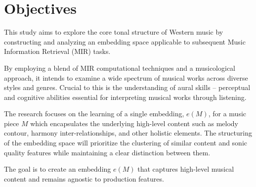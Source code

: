 \section{Objectives}

This study aims to explore the core tonal structure of Western music by constructing and analyzing an embedding space applicable to subsequent Music Information Retrieval (MIR) tasks. 

By employing a blend of MIR computational techniques and a musicological approach, it intends to examine a wide spectrum of musical works across diverse styles and genres. Crucial to this is the understanding of aural skills – perceptual and cognitive abilities essential for interpreting musical works through listening. 

The research focuses on the learning of a single embedding, $e(M)$, for a music piece $M$ which encapsulates the underlying high-level content such as melody contour, harmony inter-relationships, and other holistic elements. The structuring of the embedding space will prioritize the clustering of similar content and sonic quality features while maintaining a clear distinction between them. 

The goal is to create an embedding $e(M)$ that captures high-level musical content and remains agnostic to production features.